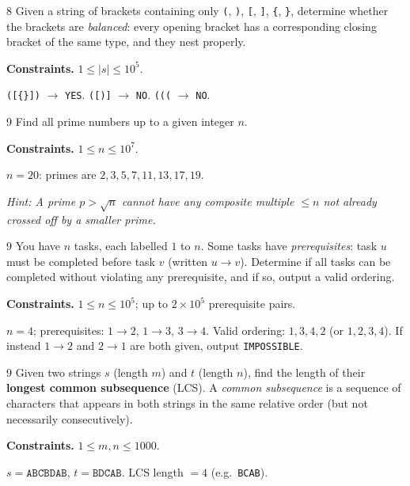 \begin{problem}{8}
Given a string of brackets containing only
\texttt{(}, \texttt{)}, \texttt{[}, \texttt{]}, \texttt{\{}, \texttt{\}},
determine whether the brackets are \emph{balanced}: every opening bracket
has a corresponding closing bracket of the same type, and they nest
properly.

\smallskip\noindent\textbf{Constraints.} $1 \le |s| \le 10^5$.

\begin{example}
\texttt{([\{\}])} $\to$ \texttt{YES}.\quad
\texttt{([)]} $\to$ \texttt{NO}.\quad
\texttt{(((} $\to$ \texttt{NO}.
\end{example}
\task
\end{problem}

\begin{problem}{9}
Find all prime numbers up to a given integer $n$.

\smallskip\noindent\textbf{Constraints.} $1 \le n \le 10^7$.

\begin{example}
$n = 20$: primes are $2, 3, 5, 7, 11, 13, 17, 19$.
\end{example}
\task
\noindent\textit{Hint: A prime $p > \sqrt{n}$ cannot have any composite
multiple $\le n$ not already crossed off by a smaller prime.}
\end{problem}

\begin{problem}{9}
You have $n$ tasks, each labelled $1$ to $n$. Some tasks have
\emph{prerequisites}: task $u$ must be completed before task $v$
(written $u \to v$). Determine if all tasks can be completed without
violating any prerequisite, and if so, output a valid ordering.

\smallskip\noindent\textbf{Constraints.} $1 \le n \le 10^5$;
up to $2 \times 10^5$ prerequisite pairs.

\begin{example}
$n = 4$; prerequisites: $1 \to 2$, $1 \to 3$, $3 \to 4$.
Valid ordering: $1, 3, 4, 2$ (or $1, 2, 3, 4$).
If instead $1 \to 2$ and $2 \to 1$ are both given, output \texttt{IMPOSSIBLE}.
\end{example}
\task
\end{problem}

\begin{problem}{9}
Given two strings $s$ (length $m$) and $t$ (length $n$), find the length
of their \textbf{longest common subsequence} (LCS). A \emph{common
subsequence} is a sequence of characters that appears in both strings in
the same relative order (but not necessarily consecutively).

\smallskip\noindent\textbf{Constraints.} $1 \le m, n \le 1000$.

\begin{example}
$s = \texttt{ABCBDAB}$, $t = \texttt{BDCAB}$. LCS length $= 4$
(e.g.\ \texttt{BCAB}).
\end{example}
\task
\end{problem}

